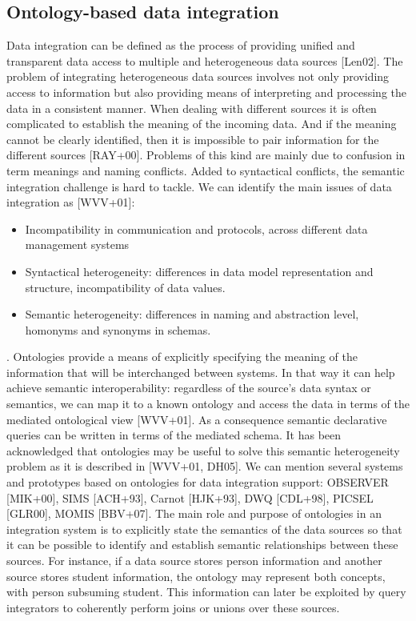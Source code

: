 

\subsection{Ontology-based data integration}
\label{obdi}

Data integration can be defined as the process of providing unified and transparent data access to multiple and heterogeneous data sources [Len02]. The problem of integrating heterogeneous data sources involves not only providing access to information but also providing means of interpreting and processing the data in a consistent manner. When dealing with different sources it is often complicated to establish the meaning of the incoming data. And if the meaning cannot be clearly identified, then it is impossible to pair information for the different sources [RAY+00]. Problems of this kind are mainly due to confusion in term meanings and naming conflicts. Added to syntactical conflicts, the semantic integration challenge is hard to tackle.
We can identify the main issues of data integration as [WVV+01]:
\begin{itemize}
	\item Incompatibility in communication and protocols, across different data management systems
	\item Syntactical heterogeneity: differences in data model representation and structure, incompatibility of data values.
	\item Semantic heterogeneity: differences in naming and abstraction level, homonyms and synonyms in schemas.
\end{itemize}.
Ontologies provide a means of explicitly specifying the meaning of the information that will be interchanged between systems. In that way it can help achieve semantic interoperability: regardless of the source's data syntax or semantics, we can map it to a known ontology and access the data in terms of the mediated ontological view [WVV+01]. As a consequence semantic declarative queries can be written in terms of the mediated schema.
It has been acknowledged that ontologies may be useful to solve this semantic heterogeneity problem as it is described in [WVV+01, DH05]. We can mention several systems and prototypes based on ontologies for data integration support: OBSERVER [MIK+00], SIMS [ACH+93], Carnot [HJK+93], DWQ [CDL+98], PICSEL [GLR00], MOMIS [BBV+07].
The main role and purpose of ontologies in an integration system is to explicitly state the semantics of the data sources so that it can be possible to identify and establish semantic relationships between these sources. For instance, if a data source stores person information and another source stores student information, the ontology may represent both concepts, with person subsuming student. This information can later be exploited by query integrators to coherently perform joins or unions over these sources.
